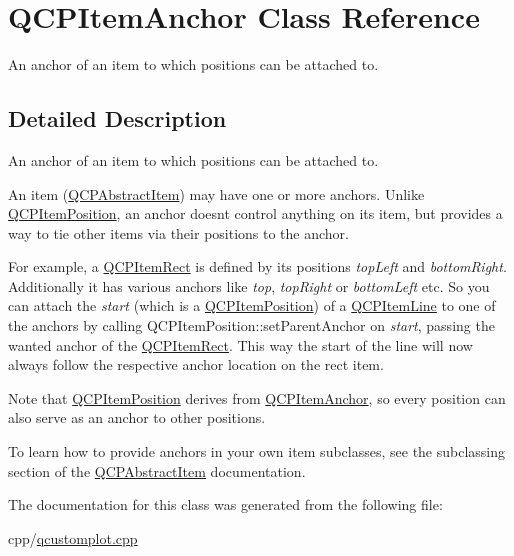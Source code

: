 \hypertarget{class_q_c_p_item_anchor}{}\section{Q\+C\+P\+Item\+Anchor Class Reference}
\label{class_q_c_p_item_anchor}


An anchor of an item to which positions can be attached to.  




\subsection{Detailed Description}
An anchor of an item to which positions can be attached to. 

An item (\mbox{\hyperlink{class_q_c_p_abstract_item}{Q\+C\+P\+Abstract\+Item}}) may have one or more anchors. Unlike \mbox{\hyperlink{class_q_c_p_item_position}{Q\+C\+P\+Item\+Position}}, an anchor doesn\textquotesingle{}t control anything on its item, but provides a way to tie other items via their positions to the anchor.

For example, a \mbox{\hyperlink{class_q_c_p_item_rect}{Q\+C\+P\+Item\+Rect}} is defined by its positions {\itshape top\+Left} and {\itshape bottom\+Right}. Additionally it has various anchors like {\itshape top}, {\itshape top\+Right} or {\itshape bottom\+Left} etc. So you can attach the {\itshape start} (which is a \mbox{\hyperlink{class_q_c_p_item_position}{Q\+C\+P\+Item\+Position}}) of a \mbox{\hyperlink{class_q_c_p_item_line}{Q\+C\+P\+Item\+Line}} to one of the anchors by calling Q\+C\+P\+Item\+Position\+::set\+Parent\+Anchor on {\itshape start}, passing the wanted anchor of the \mbox{\hyperlink{class_q_c_p_item_rect}{Q\+C\+P\+Item\+Rect}}. This way the start of the line will now always follow the respective anchor location on the rect item.

Note that \mbox{\hyperlink{class_q_c_p_item_position}{Q\+C\+P\+Item\+Position}} derives from \mbox{\hyperlink{class_q_c_p_item_anchor}{Q\+C\+P\+Item\+Anchor}}, so every position can also serve as an anchor to other positions.

To learn how to provide anchors in your own item subclasses, see the subclassing section of the \mbox{\hyperlink{class_q_c_p_abstract_item}{Q\+C\+P\+Abstract\+Item}} documentation. 

The documentation for this class was generated from the following file\+:\begin{DoxyCompactItemize}
\item 
cpp/\mbox{\hyperlink{qcustomplot_8cpp}{qcustomplot.\+cpp}}\end{DoxyCompactItemize}
